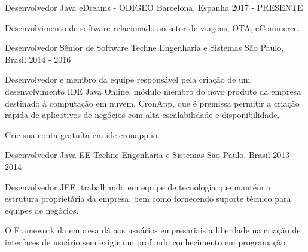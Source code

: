 

\begin{cventries}

  \cventry
    {Desenvolvedor Java} %
    {eDreams - ODIGEO} %
    {Barcelona, Espanha} %
    {2017 - PRESENTE} %
    {
      \begin{cvitems} %
        \item {Desenvolvimento de software relacionado ao setor de viagens, OTA, eCommerce.}
      \end{cvitems}
    }

  \cventry
    {Desenvolvedor Sênior de Software} %
    {Techne Engenharia e Sistemas} %
    {São Paulo, Brasil} %
    {2014 - 2016} %
    {
      \begin{cvitems} %
        \item {Desenvolvedor e membro da equipe responsável pela criação de um desenvolvimento IDE Java Online, módulo membro do novo produto da empresa destinado à computação em nuvem, CronApp, que é premissa permitir a criação rápida de aplicativos de negócios com alta escalabilidade e disponibilidade.}
        \item {Crie sua conta gratuíta em ide.cronapp.io}
      \end{cvitems}
    }

  \cventry
    {Desenvolvedor Java EE} %
    {Techne Engenharia e Sistemas} %
    {São Paulo, Brasil} %
    {2013 - 2014} %
    {
      \begin{cvitems} %
        \item {Desenvolvedor JEE, trabalhando em equipe de tecnologia que mantém a estrutura proprietária da empresa, bem como fornecendo suporte técnico para equipes de negócios.}
        \item {O Framework da empresa dá aos usuários empresariais a liberdade na criação de interfaces de usuário sem exigir um profundo conhecimento em programação.}
      \end{cvitems}
    }


\end{cventries}
